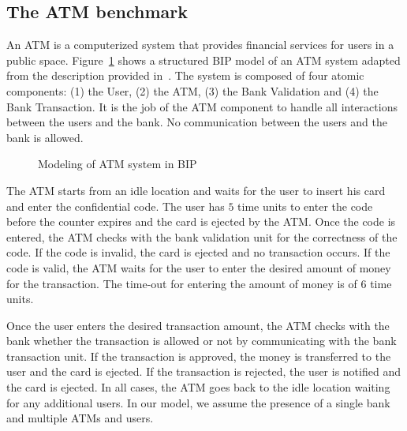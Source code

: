 \subsection{The ATM benchmark}
An ATM is a computerized system that provides financial services for users in 
a public space. 
Figure~\ref{fig:atm_bip} shows a structured BIP model of an ATM system adapted from the
description provided in~\cite{atm}.
The system is composed of four atomic components: (1) the User, (2) the ATM, (3) the Bank Validation 
and (4) the Bank Transaction. It is the job of the ATM component to handle all interactions between the 
users and the bank. No communication between the users and the bank is allowed. 
\begin{figure}[bt]
 \centering
  \resizebox{1.0\textwidth}{!}{
       
  }
  \caption{Modeling of ATM system in BIP} \vspace*{-0.5cm}
  \label{fig:atm_bip}
\end{figure}

The ATM starts from an idle location and waits for the user to insert his card 
and enter the confidential code. The user has $5$ time units
to enter the code before the counter expires and the card is ejected by the ATM. 
Once the code is entered, the ATM checks with the bank validation unit for 
the correctness of the code. If the code is invalid, the card is ejected
and no transaction occurs. If the code is valid, the ATM waits for the user to enter
the desired amount of money for the transaction. The time-out for entering the amount 
of money is of $6$ time units. 

Once the user enters the desired transaction amount, the ATM checks with the bank whether 
the transaction is allowed or not by communicating with the bank transaction unit.
If the transaction is approved, the money is transferred to the user and the card is ejected. 
If the transaction is rejected, the user is notified and the card is ejected. In all cases, 
the ATM goes back to the idle location waiting for any additional users. 
In our model, we assume the presence of a single bank and multiple ATMs and users. 

